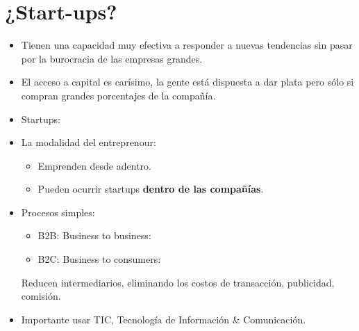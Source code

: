 \section{¿Start-ups?}
\begin{itemize}
    \item Tienen una capacidad muy efectiva a responder a nuevas tendencias sin pasar por la burocracia de las empresas grandes.
    \item El acceso a capital es carísimo, la gente está dispuesta a dar plata pero sólo si compran grandes porcentajes de la compañía.
    \item Startups:
        \begin{center}
        \end{center}
    
    \item La modalidad del entreprenour:
        \begin{itemize}
            \item Emprenden desde adentro.
            \item Pueden ocurrir startups \textbf{dentro de las compañías}.
        \end{itemize}
    
    \item Procesos simples:
        \begin{itemize}
            \item B2B: Business to business: 
            \item B2C: Business to consumers: 
        \end{itemize}
        Reducen intermediarios, eliminando los costos de transacción, publicidad, comisión.
    
    \item Importante usar TIC, Tecnología de Información \& Comunicación.


\end{itemize}
